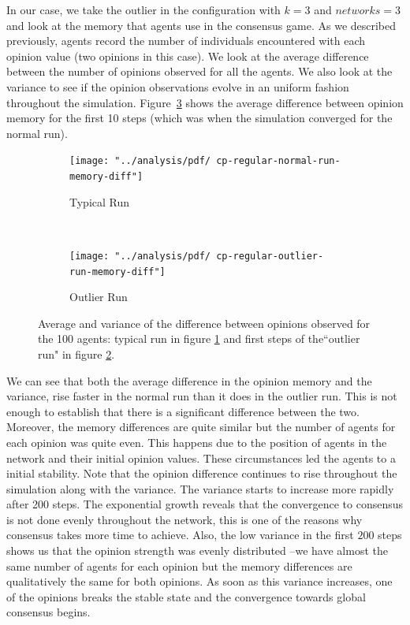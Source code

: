 \documentclass[preprint,number]{elsarticle}
\begin{document}
\noindent In our case, we take the outlier in the configuration with $k=3$ and $networks=3$ and look at the memory that agents use in the consensus game. As we described previously, agents record the number of individuals encountered with each opinion value (two opinions in this case). We look at the average difference between the number of opinions observed for all the agents. We also look at the variance to see if the opinion observations evolve in an uniform fashion throughout the simulation. Figure~\ref{fig:ctx_perm_kreg_runs_diff} shows the average difference between opinion memory for the first 10 steps (which was when the simulation converged for the normal run).

\begin{figure}[H]
	\centering
	\begin{subfigure}{1\linewidth}
		\centering
		\texttt{[image: "../analysis/pdf/ cp-regular-normal-run-memory-diff"]}
		\caption{Typical Run}
		\label{fig:ctx_perm_kreg_run_normal_diff}
	\end{subfigure}%
	\\
	\begin{subfigure}{1\linewidth}
		\centering
		\texttt{[image: "../analysis/pdf/ cp-regular-outlier-run-memory-diff"]}
		\caption{Outlier Run}
		\label{fig:ctx_perm_kreg_run_outlier_diff}
	\end{subfigure}
	
	\begin{minipage}{0.9\linewidth}
		\vspace{0.2cm}
		\caption{Average and variance of the difference between opinions observed for the 100 agents: typical run in figure \ref{fig:ctx_perm_kreg_run_normal_diff} and first steps of the``outlier run" in figure \ref{fig:ctx_perm_kreg_run_outlier_diff}.}
		\label{fig:ctx_perm_kreg_runs_diff}
	\end{minipage}
\end{figure}

We can see that both the average difference in the opinion memory and the variance, rise faster in the normal run than it does in the outlier run. This is not enough to establish that there is a significant difference between the two. Moreover, the memory differences are quite similar but the number of agents for each opinion was quite even. This happens due to the position of agents in the network and their initial opinion values. These circumstances led the agents to a initial stability. Note that the opinion difference continues to rise throughout the simulation along with the variance. The variance starts to increase more rapidly after 200 steps. The exponential growth reveals that the convergence to consensus is not done evenly throughout the network, this is one of the reasons why consensus takes more time to achieve. Also, the low variance in the first $200$ steps shows us that the opinion strength was evenly distributed --we have almost the same number of agents for each opinion but the memory differences are qualitatively the same for both opinions. As soon as this variance increases, one of the opinions breaks the stable state and the convergence towards global consensus begins. 
\end{document}
